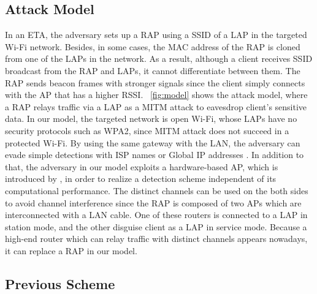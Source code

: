 \documentclass[paper]{ieice}
\begin{document}
\subsection{Attack Model}
In an ETA, the adversary sets up a RAP using a SSID of a LAP in the targeted Wi-Fi network.
Besides, in some cases, the MAC address of the RAP is cloned from one of the LAPs in the network\cite{spoof-evi}.
As a result, although a client receives SSID broadcast from the RAP and LAPs, it cannot differentiate between them.
The RAP sends beacon frames with stronger signals since the client simply connects with the AP that has a higher RSSI.
\figurename~\ref{fig:model} shows the attack model, where a RAP relays traffic via a LAP as a MITM attack to eavesdrop client's sensitive data.
In our model, the targeted network is open Wi-Fi, whose LAPs have no security protocols such as WPA2, since MITM attack does not succeed in a protected Wi-Fi\cite{kataoka}.
By using the same gateway with the LAN, the adversary can evade simple detections with ISP names or Global IP addresses \cite{rtt}.
In addition to that, the adversary in our model exploits a hardware-based AP, which is introduced by \cite{previous}, in order to realize a detection scheme independent of its computational performance.
The distinct channels can be used on the both sides to avoid channel interference since the RAP is composed of two APs which are interconnected with a LAN cable.
One of these routers is connected to a LAP in station mode, and the other disguise client as a LAP in service mode.
Because a high-end router which can relay traffic with distinct channels appears nowadays, it can replace a RAP in our model.

\subsection{Previous Scheme}
\end{document}
